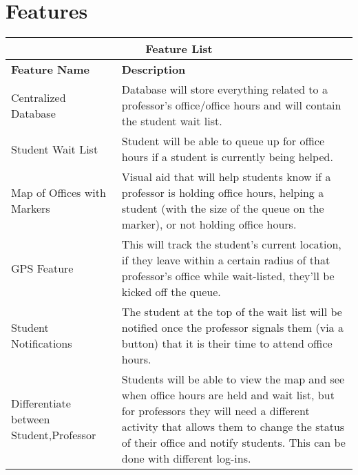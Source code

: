 \documentclass[11pt]{article} %
\begin{document}
\section{Features}

\begin{tabular}{ |p{7cm}|p{9cm}|  }
\hline
\multicolumn{2}{|c|}{Feature List} \\
\hline
\bfseries{Feature Name}& \bfseries{Description} \\
\hline
Centralized Database & Database will store everything related to a professor's office/office hours and will contain the student wait list.\\
\hline
Student Wait List & Student will be able to queue up for office hours if a student is currently being helped.\\
\hline
Map of Offices with Markers & Visual aid that will help students know if a professor is holding office hours, helping a student (with the size of the queue on the marker), or not holding office hours.\\
\hline
GPS Feature & This will track the student's current location, if they leave within a certain radius of that professor's office while wait-listed, they'll be kicked off the queue.\\
\hline
Student Notifications & The student at the top of the wait list will be notified once the professor signals them (via a button) that it is their time to attend office hours. \\
\hline
Differentiate between Student,Professor & Students will be able to view the map and see when office hours are held and wait list, but for professors they will need a different activity that allows them to change the status of their office and notify students. This can be done with different log-ins.\\
\hline

\hline
\end{tabular}
\end{document}
